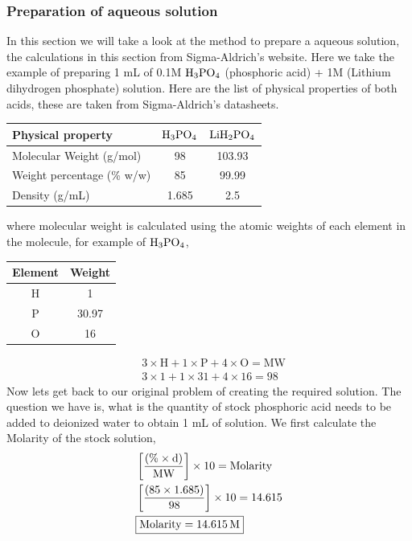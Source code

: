 \documentclass[12pt]{book}
\begin{document}
\subsubsection{Preparation of aqueous solution}
In this section we will take a look at the method to prepare a aqueous solution, the calculations in this section from Sigma-Aldrich's website. 
Here we take the example of preparing 1 mL of 0.1M $\ce{ H3PO4}$ (phosphoric acid) + 1M  (Lithium dihydrogen phosphate) solution.
Here are the list of physical properties of both acids, these are taken from Sigma-Aldrich's datasheets. 
 \begin{center}
 \begin{tabular}{ |p{3cm}||c|c| }
  \hline
  Physical property & $\ce{H3PO4}$ & $\ce{LiH2PO4}$\\
 \hline
 Molecular Weight (g/mol)& 98 & 103.93\\\hline
 Weight percentage (\% w/w) & 85 & 99.99\\\hline
 Density (g/mL) & 1.685 & 2.5\\
 \hline
 \end{tabular}
 \end{center}
 where molecular weight is calculated using the atomic weights of each element in the molecule, for example of $\ce{H3PO4}$,
 \begin{center}
 \begin{tabular}{ |c|c| }
  \hline
  Element & Weight \\
 \hline
H & 1\\
P & 30.97\\
O & 16\\
 \hline
 \end{tabular}
 \end{center}
 \begin{align}
 &3\times \textrm{H}+ 1\times \textrm{P} +4\times \textrm{O} = \textrm{MW}\nonumber \\
 &3\times 1+ 1\times 31 +4\times 16= 98\nonumber
 \end{align}
 Now lets get back to our original problem of creating the required solution.
 The question we have is, what is the quantity of stock phosphoric acid needs to be added to deionized water to obtain 1 mL of solution.
 We first calculate the Molarity of the stock solution, 
 \begin{align}
 &\left[\frac{\left( \%\times\textrm{d}\right)}{\textrm{MW}}\right]\times 10 = \textrm{Molarity}\\
 &\left[\frac{\left( 85\times\textrm{1.685}\right)}{\textrm{98}}\right]\times 10 = \ce{14.615}\nonumber\\
 & \boxed{\textrm{Molarity} = \ce{14.615M}}\nonumber
 \end{align}
\end{document}
